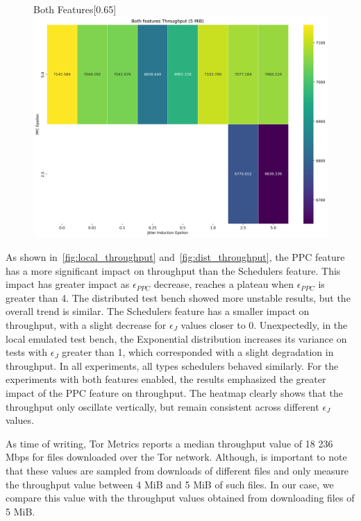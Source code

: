 \begin{figure}[htbp]
\begin{subcaptionbox}{Both Features\label{fig:dist_both_throughput}}[0.65\textwidth]
        {\includegraphics[width=\linewidth]{Chapters/Figures/Plots/dist_throughput_50_heatmap_5mib.png}}
    \end{subcaptionbox}
\end{figure}

As shown in~\autoref{fig:local_throughput} and~\autoref{fig:dist_throughput}, the PPC feature has a more significant impact on throughput than the Schedulers feature. 
This impact has greater impact as $\epsilon_{PPC}$ decrease, reaches a plateau when $\epsilon_{PPC}$ is greater than 4. The distributed test bench showed more unstable results, but the overall trend is similar. The Schedulers feature has a smaller impact on throughput, with a slight decrease for $\epsilon_{J}$ values closer to 0. Unexpectedly, in the local emulated test bench, the Exponential distribution increases its variance on tests with $\epsilon_{J}$ greater than 1, which corresponded with a slight degradation in throughput. 
In all experiments, all types schedulers behaved similarly.
For the experiments with both features enabled, the results emphasized the greater impact of the PPC feature on throughput. The heatmap clearly shows that the throughput only oscillate vertically, but remain consistent across different $\epsilon_{J}$ values.

As time of writing, Tor Metrics reports a median throughput value of 18 236 Mbps for files downloaded over the Tor network. Although, is important to note that these values are sampled from downloads of different files and only measure the throughput value between 4 MiB and 5 MiB of such files. In our case, we compare this value with the throughput values obtained from downloading files of 5 MiB.

